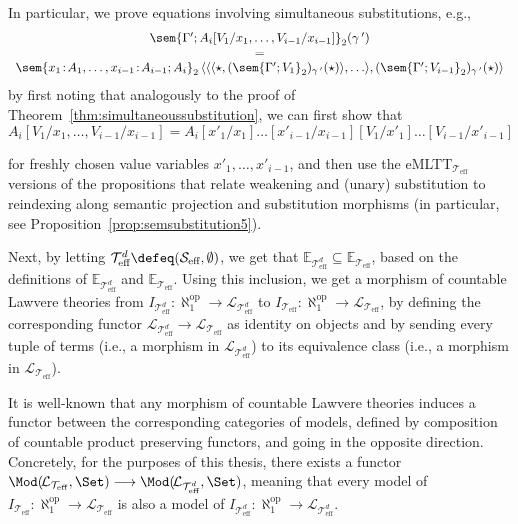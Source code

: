 In particular, we prove equations involving simultaneous substitutions, e.g.,   
\[
\begin{array}{c}
\sem{\Gamma';A_i[V_1/x_1, \ldots, V_{i-1}/x_{i-1}]}_2(\gamma\,')
\\
=
\\
\sem{x_1 \!:\! A_1, \ldots, x_{i-1} \!:\! A_{i - 1};A_i}_2\, \langle \langle \langle \star , (\sem{\Gamma'; V_1}_2)_{\gamma\,'}(\star) \rangle , \ldots \rangle , (\sem{\Gamma'; V_{i - 1}}_2)_{\gamma\,'}(\star) \rangle
\end{array}
\]
by first noting that analogously to the proof of Theorem~\ref{thm:simultaneoussubstitution}, we can first show that 
\[
A_i[V_1/x_1, \ldots, V_{i-1}/x_{i-1}] = A_i[x'_1/x_1]\ldots[x'_{i-1}/x_{i-1}][V_1/x'_1]\ldots[V_{i-1}/x'_{i-1}]
\]

\pagebreak
\noindent
for freshly chosen value variables $x'_1, \ldots, x'_{i-1}$, and then use the eMLTT$_{\mathcal{T}_{\text{eff}}}$ versions of the propositions
that relate weakening and (unary) substitution to reindexing along semantic projection and substitution morphisms (in particular, see Proposition~\ref{prop:semsubstitution5}).

Next, by letting ${\mathcal{T}^{d}_{\text{eff}}} \defeq (\mathcal{S}_{\text{eff}}, \emptyset)$, we get that  $\mathbb{E}_{\!\mathcal{T}^{d}_{\text{eff}}} \subseteq \mathbb{E}_{\!\mathcal{T}_{\text{eff}}}$, based on the definitions of $\mathbb{E}_{\!\mathcal{T}^{d}_{\text{eff}}}$ and $\mathbb{E}_{\!\mathcal{T}_{\text{eff}}}$. Using this inclusion, we get a morphism of countable Lawvere theories from $I_{\mathcal{T}^d_{\text{eff}}} : \aleph_{\!\!1}^{\text{op}} \longrightarrow \mathcal{L}_{\mathcal{T}^d_{\text{eff}}}$ to $I_{\mathcal{T}_{\text{eff}}} : \aleph_{\!\!1}^{\text{op}} \longrightarrow \mathcal{L}_{\mathcal{T}_{\text{eff}}}$, by defining the corresponding functor $\mathcal{L}_{\mathcal{T}^d_{\text{eff}}} \longrightarrow \mathcal{L}_{\mathcal{T}_{\text{eff}}}$ as identity on objects and by sending every tuple of terms (i.e., a morphism in $\mathcal{L}_{\mathcal{T}^d_{\text{eff}}}$) to its equivalence class (i.e., a morphism in $\mathcal{L}_{\mathcal{T}_{\text{eff}}}$). 

It is well-known that any morphism of countable Lawvere theories induces a functor between the corresponding categories of models, defined by composition of countable product preserving functors,  and going in the opposite direction. Concretely, for the purposes of this thesis, there exists a functor $\Mod(\!\mathcal{L}_{\mathcal{T}_{\text{eff}}},\Set) \longrightarrow \Mod(\!\mathcal{L}_{\mathcal{T}^d_{\text{eff}}},\Set)$, meaning that every model of $I_{\mathcal{T}_{\text{eff}}} : \aleph_{\!\!1}^{\text{op}} \!\longrightarrow\! \mathcal{L}_{\mathcal{T}_{\text{eff}}}$ is also a model of $I_{\mathcal{T}^d_{\text{eff}}} : \aleph_{\!\!1}^{\text{op}} \!\longrightarrow\! \mathcal{L}_{\mathcal{T}^d_{\text{eff}}}$. 

